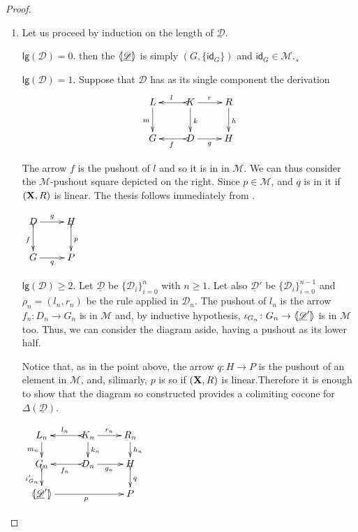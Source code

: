 \documentclass[a4paper,UKenglish,cleveref,pdftex,thm-restate,numberwithinsect,anonymous]{lipics}
\newcommand{\id}[1]{\mathsf{id}_{#1}}
\def\R{\mathsf{R}}
\def\X{\textbf {\textup{X}}}
\def\G{\textbf {\textup{G}}}
\newcommand{\dder}[1]{\mathscr{#1}}
\newcommand{\der}[1]{\underline{\dder{#1}}}
\newcommand{\lpro}{\langle \hspace{-1.85pt}[}
\newcommand{\rpro}{]\hspace{-1.85pt}\rangle}
\newcommand{\tpro}[1]{\lpro \der{#1}\rpro}
\newcommand{\lgh}[0]{\mathsf{lg}}
\begin{document}
\begin{proof}
	\begin{enumerate}
		\item Let us proceed by induction on the length of $\der{D}$.
		
		
		\smallskip \noindent
		$\lgh(\dder{D})=0$. then the
		$\tpro{\dder{D}}$ is simply $(G, \{\id{G}\})$ and
		$\id{G}\in \mathcal{M}$.¸
		
		\smallskip \noindent
		$\lgh(\dder{D})=1$. Suppose that $\dder{D}$
		has as its single component the derivation
		\[\xymatrix{L \ar[d]_{m}& K \ar[d]^{k}\ar@{>->}[l]_{l} \ar[r]^{r} & R \ar[d]^{h} \\G& \ar@{>->}[l]^{f} D \ar[r]_{g}& H  \\}\]
	
		\parbox{11cm}{The arrow $f$ is  the pushout of $l$ and so it is in in $\mathcal{M}$. We can thus consider the $\mathcal{M}$-pushout square depicted on the right.
		Since $p\in \mathcal{M}$, and $q$ is in it if $(\X, \R)$ is linear. The thesis follows immediately from .}
		\parbox{2cm}{
			$\xymatrix{D \ar@{>->}[d]_{f} \ar[r]^{g} & H \ar@{>->}[d]^{p} \\G \ar[r]_{q}& P }$}
		
		\smallskip \noindent
	\parbox{9cm}{$\lgh(\dder{D})\geq 2$. Let $\der{D}$ be
		$\{\dder{D}_i\}_{i=0}^n$ with $n\geq 1$. Let also $\der{D}'$ be
		$\{\dder{D}_i\}^{n-1}_{i=0}$ and $\rho_n=(l_n, r_n)$ be the rule
		applied in $\dder{D}_n$. The pushout of $l_n$ is the arrow
		$f_n\colon D_n\to G_n$ is in $\mathcal{M}$ and, by inductive
		hypothesis, $\iota_{G_{n}}\colon G_{n}\to \lpro \der{D}'\rpro$ is
		in $\mathcal{M}$ too. Thus, we can consider the diagram aside,
		having a pushout as its lower half.

\smallskip \noindent 
\parbox{13.45cm} {\hspace{15pt}
		Notice that, as in the point above, the arrow $q\colon H\to P$ is the pushout of an element in $\mathcal{M}$, and, silimarly, $p$ is so if $(\X, \R)$ is linear.Therefore it is enough to show that the diagram so constructed provides a colimiting cocone for $\Delta(\der{D})$.}}
		\parbox{4cm}{\vspace{-1.5cm}$\xymatrix@R=15pt{L_n \ar[d]_{m_{n}}& K_{n} \ar[d]^{k_{n}}\ar@{>->}[l]_{l_{n}} \ar[r]^{r_{n}} & R_{n} \ar[d]^{h_n} \\G_{n} \ar@{>->}[d]_{\iota'_{G_{n}}}& \ar@{>->}[l]^{f_n} D_n \ar[r]_{g_n}& H  \ar@{>->}[d]^{q}\\ \lpro \der{D}' \ar[rr]_{p}\rpro && P}$}
		

\end{enumerate}
\end{proof}
\end{document}
